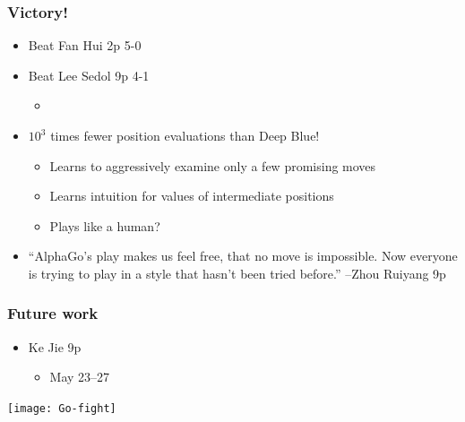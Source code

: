 \documentclass{beamer}
\begin{document}
\begin{frame}
  \frametitle{Victory!}
  \begin{itemize}
  \item Beat Fan Hui 2p 5-0
  \item Beat Lee Sedol 9p 4-1
    \begin{itemize}
    \item \href{http://ps.waltheri.net/database/game/72538/}{}
    \end{itemize}
  \item $10^3$ times fewer position evaluations than Deep Blue!
    \begin{itemize}
    \item Learns to aggressively examine only a few promising moves
    \item Learns intuition for values of intermediate positions
    \item Plays like a human?
    \end{itemize}
    \item ``AlphaGo's play makes us feel free, that no move is impossible. Now everyone is trying to play in a style that hasn't been tried before.'' --Zhou Ruiyang 9p
  \end{itemize}
\end{frame}

\begin{frame}
  \frametitle{Future work}
  \begin{itemize}
  \item Ke Jie 9p
    \begin{itemize}
    \item May 23--27
    \end{itemize}
  \end{itemize}
\end{frame}

\begin{frame}
  \begin{center}
    \texttt{[image: Go-fight]}
  \end{center}
\end{frame}
\end{document}
